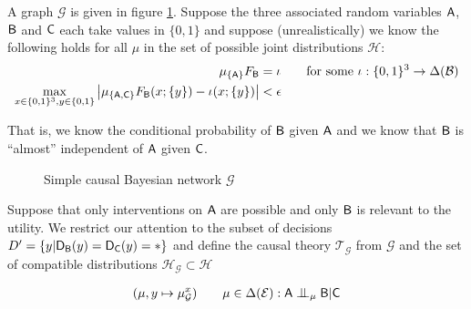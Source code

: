 \begin{example}\label{ex:extn_cbn}

A graph $\mathcal{G}$ is given in figure \ref{fig:simple_cbn}. Suppose the three associated random variables $\mathsf{A}$, $\mathsf{B}$ and $\mathsf{C}$ each take values in $\{0,1\}$ and suppose (unrealistically) we know the following holds for all $\mu$ in the set of possible joint distributions $\mathscr{H}$:
\begin{align}
    \mu_{\{\mathsf{A}\}} F_{\mathsf{B}} &= \iota \qquad \text{for some }\iota:\{0,1\}^3\to \Delta(\mathcal{B})\\
    \max_{x\in\{0,1\}^3,y\in\{0,1\}}\left|\mu_{\{\mathsf{A},\mathsf{C}\}} F_{\mathsf{B}}(x;\{y\}) - \iota(x;\{y\}) \right| &< \epsilon \label{eq:app_ci}
\end{align}

That is, we know the conditional probability of $\mathsf{B}$ given $\mathsf{A}$ and we know that $\mathsf{B}$ is ``almost'' independent of $\mathsf{A}$ given $\mathsf{C}$.

\begin{figure}
    \centering
    \caption{Simple causal Bayesian network $\mathcal{G}$}
    \label{fig:simple_cbn}
\end{figure}

Suppose that only interventions on $\mathsf{A}$ are possible and only $\mathsf{B}$ is relevant to the utility. We restrict our attention to the subset of decisions $D'=\{y|\mathsf{D}_{\mathsf{B}}(y)=\mathsf{D}_{\mathsf{C}}(y)=*\}$ and define the causal theory $\mathscr{T}_{\mathcal{G}}$ from $\mathcal{G}$ and the set of compatible distributions $\mathscr{H}_\mathcal{G}\subset\mathscr{H}$

\begin{align}
    (\mu,y\mapsto \mu_{\mathcal{G}}^x ) \qquad \mu\in\Delta(\mathcal{E}):\RV{A}\CI_{\mu}\RV{B}|\RV{C} \label{eq:ocbn}
\end{align}


\end{example}
